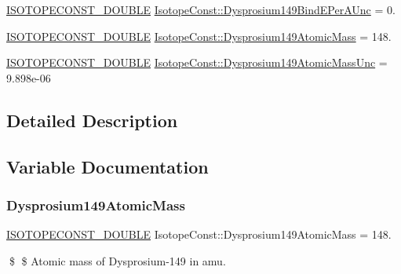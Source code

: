 \begin{DoxyCompactItemize}
\item 
\mbox{\hyperlink{group___isotope_const-_macros_ga8f45a7272ce02c0b4c65c44636ed719a}{I\+S\+O\+T\+O\+P\+E\+C\+O\+N\+S\+T\+\_\+\+D\+O\+U\+B\+LE}} \mbox{\hyperlink{group___isotope_const-_dysprosium-_dy149_ga9cbdfbd6366dbf1a40681cb786acfc85}{Isotope\+Const\+::\+Dysprosium149\+Bind\+E\+Per\+A\+Unc}} = 0.
\item 
\mbox{\hyperlink{group___isotope_const-_macros_ga8f45a7272ce02c0b4c65c44636ed719a}{I\+S\+O\+T\+O\+P\+E\+C\+O\+N\+S\+T\+\_\+\+D\+O\+U\+B\+LE}} \mbox{\hyperlink{group___isotope_const-_dysprosium-_dy149_ga95bea00089f6a7577e58de268830b193}{Isotope\+Const\+::\+Dysprosium149\+Atomic\+Mass}} = 148.
\item 
\mbox{\hyperlink{group___isotope_const-_macros_ga8f45a7272ce02c0b4c65c44636ed719a}{I\+S\+O\+T\+O\+P\+E\+C\+O\+N\+S\+T\+\_\+\+D\+O\+U\+B\+LE}} \mbox{\hyperlink{group___isotope_const-_dysprosium-_dy149_gaf28ef81ac4cb8586cc9f1142d2c95b22}{Isotope\+Const\+::\+Dysprosium149\+Atomic\+Mass\+Unc}} = 9.\+898e-\/06
\end{DoxyCompactItemize}


\subsection{Detailed Description}


\subsection{Variable Documentation}
\mbox{\label{group___isotope_const-_dysprosium-_dy149_ga95bea00089f6a7577e58de268830b193}} 
\subsubsection{\texorpdfstring{Dysprosium149\+Atomic\+Mass}{Dysprosium149AtomicMass}}
{\footnotesize\ttfamily \mbox{\hyperlink{group___isotope_const-_macros_ga8f45a7272ce02c0b4c65c44636ed719a}{I\+S\+O\+T\+O\+P\+E\+C\+O\+N\+S\+T\+\_\+\+D\+O\+U\+B\+LE}} Isotope\+Const\+::\+Dysprosium149\+Atomic\+Mass = 148.}

\$ \$ Atomic mass of Dysprosium-\/149 in amu. \mbox{\label{group___isotope_const-_dysprosium-_dy149_gaf28ef81ac4cb8586cc9f1142d2c95b22}} 
